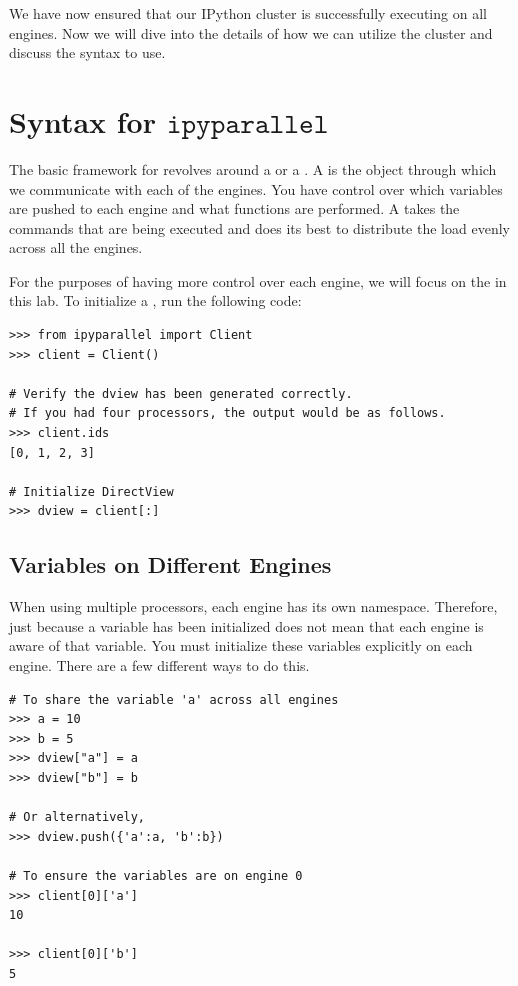 We have now ensured that our IPython cluster is successfully executing on all engines. Now we will dive into the details of how we can utilize the cluster and discuss the syntax to use.

\section*{Syntax for $\texttt{ipyparallel}$}
The basic framework for  revolves around a  or a .
A  is the object through which we communicate with each of the engines. You have control over which variables are pushed to each engine and what functions are performed. A  takes the commands that are being executed and does its best to distribute the load evenly across all the engines.

For the purposes of having more control over each engine, we will focus on the  in this lab. To initialize a , run the following code:

\begin{lstlisting}
>>> from ipyparallel import Client
>>> client = Client()

# Verify the dview has been generated correctly.
# If you had four processors, the output would be as follows.
>>> client.ids
[0, 1, 2, 3]

# Initialize DirectView
>>> dview = client[:]
\end{lstlisting}

\subsection*{Variables on Different Engines}
When using multiple processors, each engine has its own namespace. Therefore, just because a variable has been initialized does not mean that each engine is aware of that variable. You must initialize these variables explicitly on each engine. There are a few different ways to do this.

\begin{lstlisting}
# To share the variable 'a' across all engines
>>> a = 10
>>> b = 5
>>> dview["a"] = a
>>> dview["b"] = b

# Or alternatively,
>>> dview.push({'a':a, 'b':b})

# To ensure the variables are on engine 0
>>> client[0]['a']
10

>>> client[0]['b']
5
\end{lstlisting}

